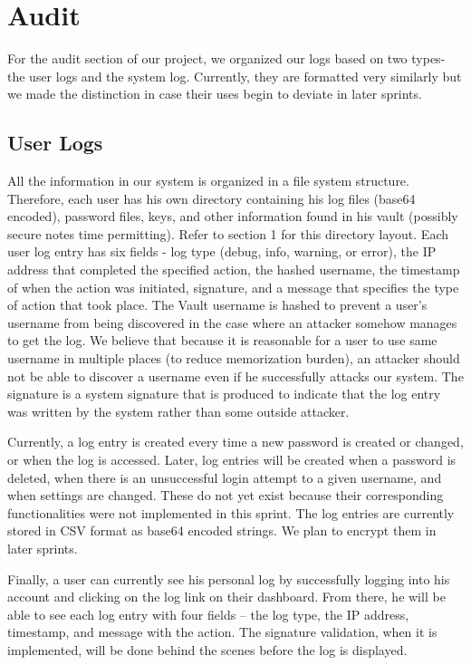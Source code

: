 \documentclass{article}
\begin{document}
\section{Audit}
For the audit section of our project, we organized our logs based on two types- the user logs and the system log. Currently, they are formatted very similarly but we made the distinction in case their uses begin to deviate in later sprints.
\subsection{User Logs}
\par All the information in our system is organized in a file system structure. Therefore, each user has his own directory containing his log files (base64 encoded), password files, keys, and other information found in his vault (possibly secure notes time permitting). Refer to section 1 for this directory layout. Each user log entry has six fields - log type (debug, info, warning, or error), the IP address that completed the specified action, the hashed username, the timestamp of when the action was initiated, signature, and a message that specifies the type of action that took place. The Vault username is hashed to prevent a user's username from being discovered in the case where an attacker somehow manages to get the log. We believe that because it is reasonable for a user to use same username in multiple places (to reduce memorization burden), an attacker should not be able to discover a username even if he successfully attacks our system. The signature is a system signature that is produced to indicate that the log entry was written by the system rather than some outside attacker.\\

\par Currently, a log entry is created every time a new password is created or changed, or when the log is accessed. Later, log entries will be created when a password is deleted, when there is an unsuccessful login attempt to a given username, and when settings are changed. These do not yet exist because their corresponding functionalities were not implemented in this sprint.  The log entries are currently stored in CSV format as base64 encoded strings. We plan to encrypt them in later sprints.\\

\par Finally, a user can currently see his personal log by successfully logging into his account and clicking on the log link on their dashboard. From there, he will be able to see each log entry with four fields – the log type, the IP address, timestamp, and message with the action. The signature validation, when it is implemented, will be done behind the scenes before the log is displayed.
\end{document}
